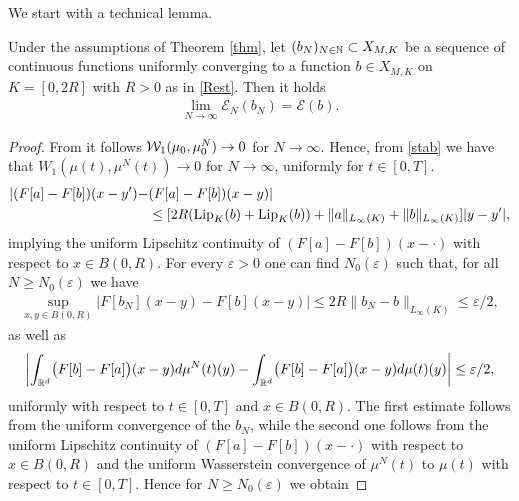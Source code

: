We start with a technical lemma.

\begin{lemma}\label{lemma-semicontinuous-1}
	Under the assumptions of Theorem \ref{thm}, let $(b_N)_{N \in \mathbb{N}}\subset X_{M,K}$ be a sequence of continuous functions uniformly converging to a function $b \in X_{M,K}$ on $K=[0,2R]$  with $R>0$ as in \eqref{Rest}. %
Then it holds
	\begin{align*}
		\lim_{N\rightarrow\infty} \mathcal E_{N}(b_{N})= \mathcal E(b).
	\end{align*}
\end{lemma}

\begin{proof}
	From \cite[Lemma 3.3]{fornahuetter} it follows $\mathcal{W}_1(\mu_0,\mu^N_0) \rightarrow 0$ for $N \rightarrow \infty$. Hence, from \eqref{stab} we have that $W_1(\mu(t),\mu^N(t))\rightarrow 0$ for $N\rightarrow\infty$, uniformly for  $t \in [0,T]$.%
\begin{align*}
|(F[a] -F[ b])(x-y') - &(F[a] -F[ b])(x- y)|  \\
& \leq [2R (\textup{Lip}_K( b) + \textup{Lip}_K( b))    +\|a\|_{L_\infty(K)} + \| b\|_{L_\infty(K)} ] |y-y'|,
\end{align*}
implying the uniform Lipschitz continuity of $(F[a] -F[ b])(x- \cdot)$ with respect to $x \in B(0,R)$.
For every $\varepsilon > 0$ one can find $N_0(\varepsilon)$ such that, for all $N \geq N_0(\varepsilon)$ we have
	\begin{align*}
		\sup_{x,y \in B(0,R)}|F[ b_{N}](x-y)-F[ b](x-y)|
			\leq 2R \| b_{N}- b\|_{L_\infty(K)}\leq\varepsilon/2,
	\end{align*}
	as well as
	\begin{align*}
		\biggl|\int_{\mathbb{R}^d}\bigl(F[ b]-F[a]\bigr)(x-y)d\mu^{N}(t)(y)
			-\int_{\mathbb{R}^d}\bigl(F[ b]-F[a]\bigr)(x-y)d\mu(t)(y)\biggr|\leq\varepsilon/2,
	\end{align*}
uniformly with respect to $t \in [0,T]$ and $x \in B(0,R)$.
	The first estimate follows from  the uniform convergence of the $ b_{N}$, while the second one follows from the uniform Lipschitz continuity of
	$(F[a] -F[ b])(x- \cdot)$ with respect to $x \in B(0,R)$  and the uniform Wasserstein convergence of $\mu^{N}(t)$ to $\mu(t)$ with respect to $t \in [0,T]$. Hence for $N\geq N_0(\varepsilon)$ we obtain

\end{proof}
